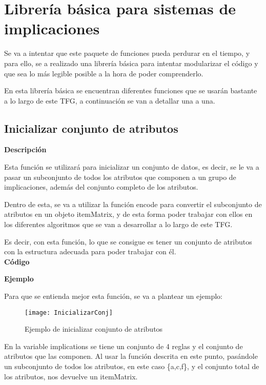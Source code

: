 \section{Librer\'ia b\'asica para sistemas de implicaciones}
Se va a intentar que este paquete de funciones pueda perdurar en el tiempo, y para ello, 
se a realizado una librer\'ia b\'asica para intentar modularizar el c\'odigo y que sea lo 
m\'as legible posible a la hora de poder comprenderlo.

En esta librer\'ia b\'asica se encuentran diferentes funciones que se usar\'an bastante a lo largo de este TFG, a continuaci\'on 
se van a detallar una a una.


\subsection{Inicializar conjunto de atributos}

    \textbf{Descripci\'on}

    Esta funci\'on se utilizar\'a para inicializar un conjunto de datos, es decir, se le va a pasar un subconjunto 
    de todos los atributos que componen a un grupo de implicaciones, adem\'as del conjunto completo de los atributos. 
    
    Dentro de esta, se va a utilizar la funci\'on encode para convertir el subconjunto de atributos en un objeto itemMatrix, y de esta 
    forma poder trabajar con ellos en los diferentes algoritmos que se van a desarrollar a lo largo de este TFG.

    Es decir, con esta funci\'on, lo que se consigue es tener un conjunto de atributos con la estructura adecuada para poder trabajar con \'el.
    \\

    
    \textbf{C\'odigo}
    
    
    \bigskip
    
    \textbf{Ejemplo}

    Para que se entienda mejor esta funci\'on, se va a plantear un ejemplo:

    \begin{figure}[H]
        \centering
        \texttt{[image: InicializarConj]}
        \caption{Ejemplo de inicializar conjunto de atributos}
        \label{fig:InicializarConj}
    \end{figure}

    En la variable implications se tiene un conjunto de 4 reglas y el conjunto de atributos que las componen.
    Al usar la funci\'on descrita en este punto, pas\'andole un subconjunto de todos los atributos, en este caso \{a,c,f\}, y 
    el conjunto total de los atributos, nos devuelve un itemMatrix. 
    
